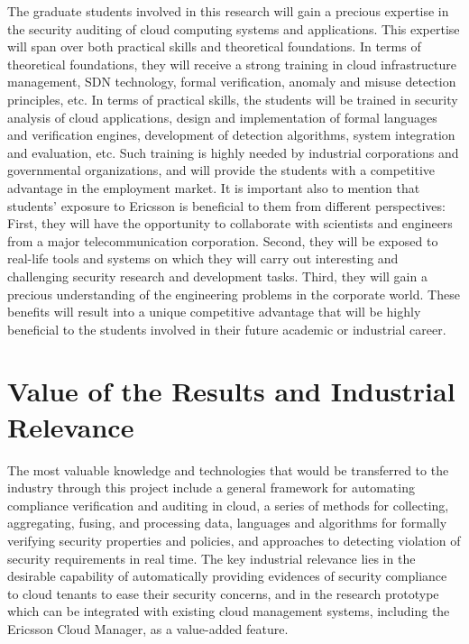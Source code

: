 \documentclass[12pt]{article}
\begin{document}
The graduate students involved in this research will gain a precious
expertise in the security auditing of cloud computing systems and
applications. This expertise will span over both practical skills and
theoretical foundations. In terms of theoretical foundations, they
will receive a strong training in cloud infrastructure management, SDN
technology, formal verification, anomaly and misuse detection
principles, etc.  In terms of practical skills, the students will be
trained in security analysis of cloud applications, design and
implementation of formal languages and verification engines,
development of detection algorithms, system integration and
evaluation, etc. Such training is highly needed by
industrial corporations and governmental organizations, and will
provide the students with a competitive advantage in the
employment market. It is important also to mention that students'
exposure to Ericsson is beneficial to them from different
perspectives: First, they will have the opportunity to collaborate
with scientists and engineers from a major telecommunication
corporation. Second, they will be exposed to real-life tools and
systems on which they will carry out interesting and challenging
security research and development tasks. Third, they will gain a
precious understanding of the engineering problems in the corporate
world. These benefits will result into a unique competitive advantage
that will be highly beneficial to the students involved in their
future academic or industrial career.

\vspace{-3mm}
\section{Value of the Results and Industrial Relevance}
\vspace{-2mm} 

The most valuable knowledge and technologies that would be transferred
to the industry through this project include a general framework for
automating compliance verification and auditing in cloud, a series of
methods for collecting, aggregating, fusing, and processing data,
languages and algorithms for formally verifying security properties
and policies, and approaches to detecting violation of security
requirements in real time. The key industrial relevance lies in the
desirable capability of automatically providing evidences of security
compliance to cloud tenants to ease their security concerns, and in
the research prototype which can be integrated with existing cloud
management systems, including the Ericsson Cloud Manager, as a
value-added feature.
\end{document}
